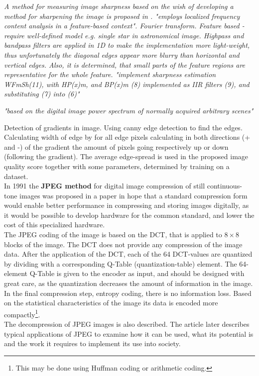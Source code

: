 \textit{A method for measuring image sharpness based on the wish of developing a method for sharpening the image is proposed in \cite{jnbm13}. "employs localized frequency content analysis in a feature-based context". Fourier transform\cite{jnbm13}. Feature based - require well-defined model e.g. single star in astronomical image. Highpass and bandpass filters are applied in 1D to make the implementation more light-weight, thus unfortunately the diagonal edges appear more blurry than horizontal and vertical edges. Also, it is determined, that small parts of the feature regions are representative for the whole feature. "implement sharpness estimation WFmSh(11), with HP(x)m, and BP(x)m (8) implemented as IIR filters (9), and substituting (7) into (6)"\\}

\textit{"based on the digital image power spectrum of normally acquired arbitrary scenes"\cite{jnbm14}\\}

Detection of gradients in image. Using canny edge detection to find the edges. Calculating width of edge by for all edge pixels calculating in both directions (+ and -) of the gradient the amount of pixels going respectively up or down (following the gradient). The average edge-spread is used in the proposed image quality score together with some parameters, determined by training on a dataset.\cite{jnbm17}\\


In 1991 the \textbf{JPEG method} for digital image compression of still continuous-tone images was proposed in a paper \cite{jpg} in hope that a standard compression form would enable better performance in compressing and storing images digitally, as it would be possible to develop hardware for the common standard, and lower the cost of this specialized hardware.\\
The JPEG coding of the image is based on the DCT, that is applied to $8\times 8$ blocks of the image. The DCT does not provide any compression of the image data. After the application of the DCT, each of the 64 DCT-values are quantized by dividing with a corresponding Q-Table (quantization-table) element. The 64-element Q-Table is given to the encoder as input, and should be designed with great care, as the quantization decreases the amount of information in the image.
In the final compression step, entropy coding, there is no information loss. Based on the statistical characteristics of the image its data is encoded more compactly\footnote{This may be done using Huffman coding or arithmetic coding.}.\\
The decompression of JPEG images is also described. The article later describes typical applications of JPEG to examine how it can be used, what its potential is and the work it requires to implement its use into society.




